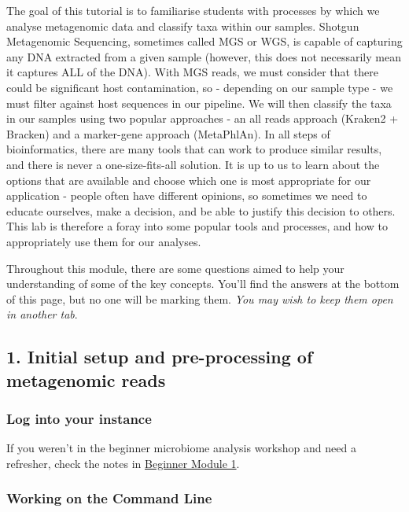 \documentclass[
]{book}
\begin{document}
The goal of this tutorial is to familiarise students with processes by which we analyse metagenomic data and classify taxa within our samples. Shotgun Metagenomic Sequencing, sometimes called MGS or WGS, is capable of capturing any DNA extracted from a given sample (however, this does not necessarily mean it captures ALL of the DNA). With MGS reads, we must consider that there could be significant host contamination, so - depending on our sample type - we must filter against host sequences in our pipeline. We will then classify the taxa in our samples using two popular approaches - an all reads approach (Kraken2 + Bracken) and a marker-gene approach (MetaPhlAn). In all steps of bioinformatics, there are many tools that can work to produce similar results, and there is never a one-size-fits-all solution. It is up to us to learn about the options that are available and choose which one is most appropriate for our application - people often have different opinions, so sometimes we need to educate ourselves, make a decision, and be able to justify this decision to others. This lab is therefore a foray into some popular tools and processes, and how to appropriately use them for our analyses.

Throughout this module, there are some questions aimed to help your understanding of some of the key concepts. You'll find the answers at the bottom of this page, but no one will be marking them. \emph{You may wish to keep them open in another tab}.

\subsection{1. Initial setup and pre-processing of metagenomic reads}\label{initial-setup-and-pre-processing-of-metagenomic-reads}

\subsubsection{Log into your instance}\label{log-into-your-instance}

If you weren't in the beginner microbiome analysis workshop and need a refresher, check the notes in \href{https://bioinformaticsdotca.github.io/BMB_2025/module-1.html\#log-into-your-aws-instance}{Beginner Module 1}.

\subsubsection{Working on the Command Line}\label{working-on-the-command-line}
\end{document}
